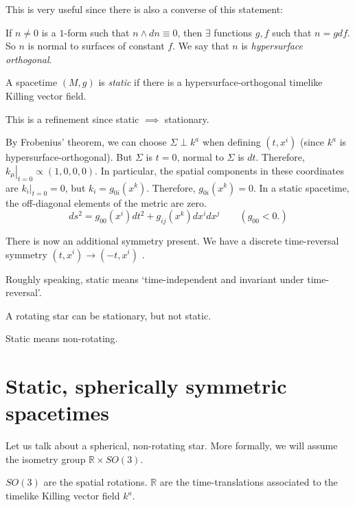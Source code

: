 This is very useful since there is also a converse of this statement:
\begin{theorem}[Frobenius]
  If $n \neq 0$ is a $1$-form such that $n \wedge dn \equiv 0$, then $\exists$ functions $g, f$ such that $n = g df$. So $n$ is normal to surfaces of constant $f$. We say that $n$ is \emph{hypersurface orthogonal}.
\end{theorem}

\begin{definition}[static]
  A spacetime $(M, g)$ is \emph{static} if there is a hypersurface-orthogonal timelike Killing vector field.
\end{definition}
\begin{remark}
  This is a refinement since static $\implies$ stationary.
\end{remark}

By Frobenius' theorem, we can choose $\Sigma \perp k^{a}$ when defining $(t, x^{i})$ (since $k^{a}$ is hypersurface-orthogonal).
But $\Sigma$ is $t = 0$, normal to $\Sigma$ is $dt$.
Therefore, $\left. k_{\mu} \right\rvert_{t = 0} \propto (1, 0, 0,0)$.
In particular, the spatial components in these coordinates are $\left. k_{i} \right\rvert_{t = 0} = 0$, but $k_{i} = g_{0i}(x^{k})$. 
Therefore, $g_{0i}(x^{k}) = 0$. In a static spacetime, the off-diagonal elements of the metric are zero.
\begin{equation}
  ds^2 = g_{00} (x^{i}) dt^2 + g_{ij}(x^{k}) dx^{i} dx^{j} \qquad (g_{00} < 0.)
\end{equation}

There is now an additional symmetry present. We have a discrete time-reversal symmetry $(t, x^{i}) \to (-t, x^{i})$ .

Roughly speaking, static means `time-independent and invariant under time-reversal'.
\begin{example}[]
  A rotating star can be stationary, but not static.
\end{example}
\begin{leftbar}
  Static means non-rotating.
\end{leftbar}

\section{Static, spherically symmetric spacetimes}%
\label{sec:static_spherically_symmetric_spacetimes_}

Let us talk about a spherical, non-rotating star.
More formally, we will assume the isometry group $\mathbb{R} \times SO(3)$.
\begin{leftbar}
  $SO(3)$ are the spatial rotations.
  $\mathbb{R}$ are the time-translations associated to the timelike Killing vector field $k^{a}$.
\end{leftbar}

